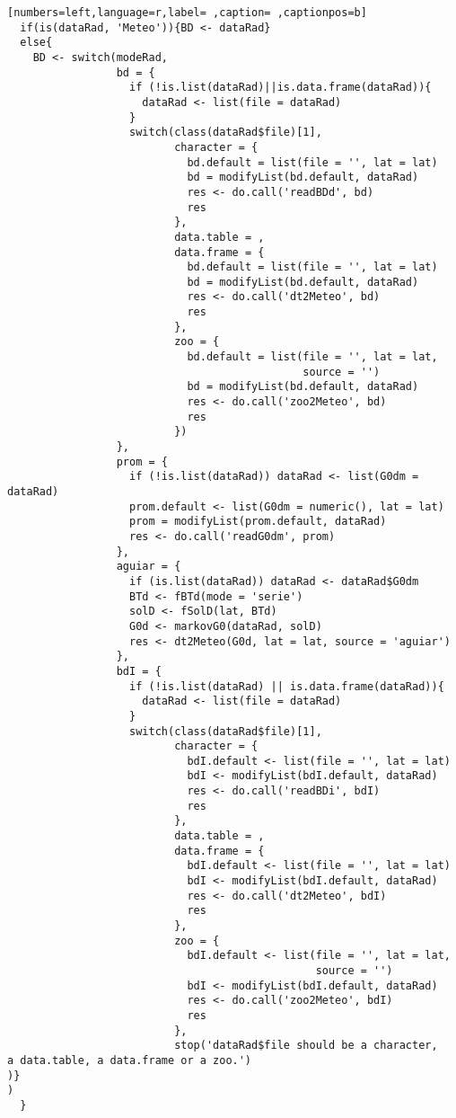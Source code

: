 \begin{lstlisting}[numbers=left,language=r,label= ,caption= ,captionpos=b]
  if(is(dataRad, 'Meteo')){BD <- dataRad}
  else{
    BD <- switch(modeRad,
                 bd = {
                   if (!is.list(dataRad)||is.data.frame(dataRad)){
                     dataRad <- list(file = dataRad)
                   }
                   switch(class(dataRad$file)[1],
                          character = {
                            bd.default = list(file = '', lat = lat)
                            bd = modifyList(bd.default, dataRad)
                            res <- do.call('readBDd', bd)
                            res
                          },
                          data.table = ,
                          data.frame = {
                            bd.default = list(file = '', lat = lat)
                            bd = modifyList(bd.default, dataRad)
                            res <- do.call('dt2Meteo', bd)
                            res
                          },
                          zoo = {
                            bd.default = list(file = '', lat = lat,
                                              source = '')
                            bd = modifyList(bd.default, dataRad)
                            res <- do.call('zoo2Meteo', bd)
                            res
                          })
                 }, 
                 prom = {
                   if (!is.list(dataRad)) dataRad <- list(G0dm = dataRad)
                   prom.default <- list(G0dm = numeric(), lat = lat)
                   prom = modifyList(prom.default, dataRad)
                   res <- do.call('readG0dm', prom)
                 }, 
                 aguiar = {
                   if (is.list(dataRad)) dataRad <- dataRad$G0dm
                   BTd <- fBTd(mode = 'serie')
                   solD <- fSolD(lat, BTd)
                   G0d <- markovG0(dataRad, solD)
                   res <- dt2Meteo(G0d, lat = lat, source = 'aguiar')
                 }, 
                 bdI = {
                   if (!is.list(dataRad) || is.data.frame(dataRad)){
                     dataRad <- list(file = dataRad)
                   }
                   switch(class(dataRad$file)[1],
                          character = {
                            bdI.default <- list(file = '', lat = lat)
                            bdI <- modifyList(bdI.default, dataRad)
                            res <- do.call('readBDi', bdI)
                            res
                          },
                          data.table = ,
                          data.frame = {
                            bdI.default <- list(file = '', lat = lat)
                            bdI <- modifyList(bdI.default, dataRad)
                            res <- do.call('dt2Meteo', bdI)
                            res
                          },
                          zoo = {
                            bdI.default <- list(file = '', lat = lat,
                                                source = '')
                            bdI <- modifyList(bdI.default, dataRad)
                            res <- do.call('zoo2Meteo', bdI)
                            res
                          },
                          stop('dataRad$file should be a character,
a data.table, a data.frame or a zoo.')
)} 
)             
  }



\end{lstlisting}
